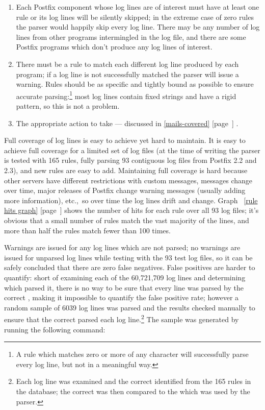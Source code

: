 \documentclass[a4paper,12pt,draft]{article}
\newcommand{\refwithpage}[1]{%
    \empty{}\ref{#1} [page~\pageref{#1}]%
}
\newcommand{\sectionref}[1]{%
    \textsection{}\refwithpage{#1}%
}
\newcommand{\numberOFlogFILES}[0]{%
    93%
}
\newcommand{\numberOFrules}[0]{%
    165%
}
\begin{document}
\begin{enumerate}

    \item Each Postfix component whose log lines are of interest must have
        at least one rule or its log lines will be silently skipped; in the
        extreme case of zero rules the parser would happily skip every log
        line.  There may be any number of log lines from other programs
        intermingled in the log file, and there are some Postfix programs
        which don't produce any log lines of interest.

    \item There must be a rule to match each different log line produced by
        each program; if a log line is not successfully matched the parser
        will issue a warning.  Rules should be as specific and tightly
        bound as possible to ensure accurate parsing:\footnote{A rule which
        matches zero or more of any character will successfully parse every
        log line, but not in a meaningful way.} most log lines contain
        fixed strings and have a rigid pattern, so this is not a problem.

    \item The appropriate action to take --- discussed in
        \sectionref{mails-covered}.

\end{enumerate}

Full coverage of log lines is easy to achieve yet hard to maintain.  It is
easy to achieve full coverage for a limited set of log files (at the time
of writing the parser is tested with \numberOFrules{} rules, fully parsing
\numberOFlogFILES{} contiguous log files from Postfix 2.2 and 2.3), and new
rules are easy to add.  Maintaining full coverage is hard because other
servers have different restrictions with custom messages, \RBL{} messages
change over time, major releases of Postfix change warning messages
(usually adding more information), etc.,\ so over time the log lines drift
and change.  Graph~\refwithpage{rule hits graph} shows the number of hits
for each rule over all \numberOFlogFILES{} log files; it's obvious that a
small number of rules match the vast majority of the lines, and more than
half the rules match fewer than 100 times.

Warnings are issued for any log lines which are not parsed; no warnings are
issued for unparsed log lines while testing with the \numberOFlogFILES{}
test log files, so it can be safely concluded that there are zero false
negatives.  False positives are harder to quantify: short of examining each
of the 60,721,709 log lines and determining which \regex{} parsed it, there
is no way to be sure that every line was parsed by the correct \regex{},
making it impossible to quantify the false positive rate; however a random
sample of 6039 log lines was parsed and the results checked manually to
ensure that the correct \regex{} parsed each log line.\footnote{Each log
line was examined and the correct \regex{} identified from the
\numberOFrules{} rules in the database; the correct \regex{} was then
compared to the \regex{} which was used by the parser.}  The sample was
generated by running the following command:
\end{document}
